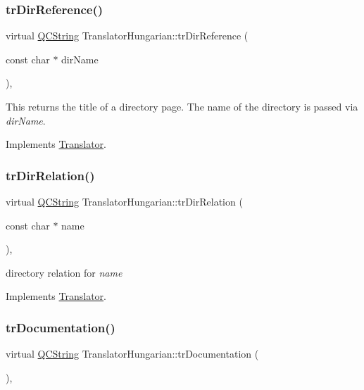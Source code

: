 \subsubsection{\texorpdfstring{trDirReference()}{trDirReference()}}
{\footnotesize\ttfamily virtual \mbox{\hyperlink{class_q_c_string}{Q\+C\+String}} Translator\+Hungarian\+::tr\+Dir\+Reference (\begin{DoxyParamCaption}\item[{const char $\ast$}]{dir\+Name }\end{DoxyParamCaption})\hspace{0.3cm}{\ttfamily [inline]}, {\ttfamily [virtual]}}

This returns the title of a directory page. The name of the directory is passed via {\itshape dir\+Name}. 

Implements \mbox{\hyperlink{class_translator}{Translator}}.

\mbox{\label{class_translator_hungarian_ae8b8fc95fa0b48fe6fe01526f9ab321d}} 
\subsubsection{\texorpdfstring{trDirRelation()}{trDirRelation()}}
{\footnotesize\ttfamily virtual \mbox{\hyperlink{class_q_c_string}{Q\+C\+String}} Translator\+Hungarian\+::tr\+Dir\+Relation (\begin{DoxyParamCaption}\item[{const char $\ast$}]{name }\end{DoxyParamCaption})\hspace{0.3cm}{\ttfamily [inline]}, {\ttfamily [virtual]}}

directory relation for {\itshape name} 

Implements \mbox{\hyperlink{class_translator}{Translator}}.

\mbox{\label{class_translator_hungarian_aa60bb570c99a8e9f083834b725252630}} 
\subsubsection{\texorpdfstring{trDocumentation()}{trDocumentation()}}
{\footnotesize\ttfamily virtual \mbox{\hyperlink{class_q_c_string}{Q\+C\+String}} Translator\+Hungarian\+::tr\+Documentation (\begin{DoxyParamCaption}{ }\end{DoxyParamCaption})\hspace{0.3cm}{\ttfamily [inline]}, {\ttfamily [virtual]}}


